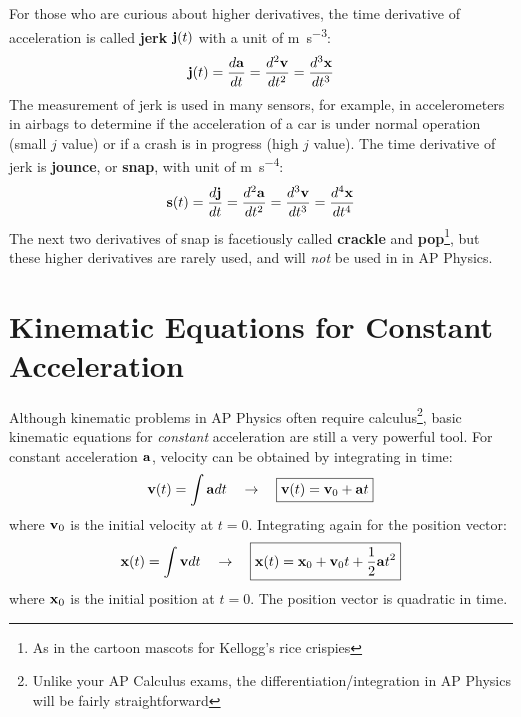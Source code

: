 \documentclass{../../../oss-handout}
\newcommand{\mb}[1]{\ensuremath\mathbf{#1}}
\begin{document}
For those who are curious about higher derivatives, the time derivative of
acceleration is called \textbf{jerk} $\mb{j}(t)$ with a unit of
\si{\metre\per\second^3}:
\begin{equation}
  \mb{j}(t)=\frac{d\mb{a}}{dt}=\frac{d^2\mb{v}}{dt^2}=\frac{d^3\mb{x}}{dt^3}
\end{equation}
The measurement of jerk is used in many sensors, for example, in accelerometers
in airbags to determine if the acceleration of a car is under normal operation
(small $j$ value) or if a crash is in progress (high $j$ value). The time
derivative of jerk is \textbf{jounce}, or \textbf{snap}, with unit of
\si{\metre\per\second^4}:
\begin{equation}
  \mb{s}(t)=\frac{d\mb{j}}{dt}=\frac{d^2\mb{a}}{dt^2}=\frac{d^3\mb{v}}{dt^3}
  =\frac{d^4\mb{x}}{dt^4}
\end{equation}
The next two derivatives of snap is facetiously called \textbf{crackle} and
\textbf{pop}\footnote{As in the cartoon mascots for Kellogg's rice crispies},
but these higher derivatives are rarely used, and will \emph{not} be used in
in AP Physics.



\section{Kinematic Equations for Constant Acceleration}

Although kinematic problems in AP Physics often require calculus\footnote{Unlike
  your AP Calculus exams, the differentiation/integration in AP Physics will be
  fairly straightforward}, basic kinematic equations for \emph{constant}
acceleration are still a very powerful tool. For constant acceleration
$\mb{a}$, velocity can be obtained by integrating in time:
\begin{equation}
  \mb{v}(t)=\int\mb{a}dt\quad\rightarrow\quad\boxed{\mb{v}(t)=\mb{v}_0+\mb{a}t}
  \label{eq:big5-1}
\end{equation}
where $\mb{v}_0$ is the initial velocity at $t=0$. Integrating again for the
position vector:
\begin{equation}
  \mb{x}(t)=\int \mb{v}dt\quad\rightarrow\quad
  \boxed{\mb{x}(t)=\mb{x}_0+\mb{v}_0t+\frac12 \mb{a}t^2}
  \label{eq:big5-2}
\end{equation}
where $\mb{x}_0$ is the initial position at $t=0$. The position vector is
quadratic in time.
\end{document}
